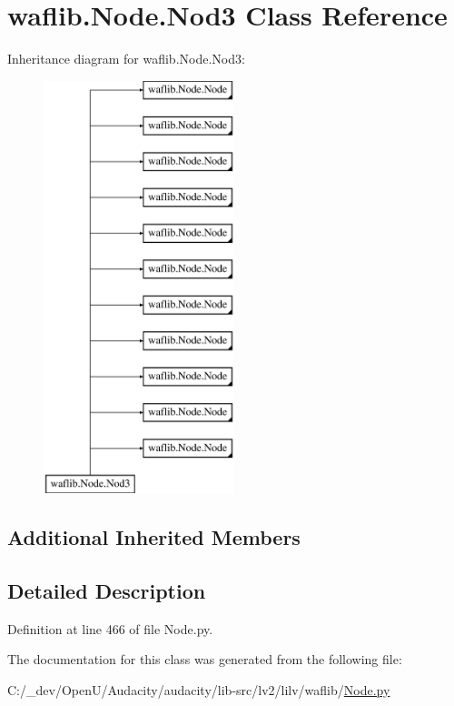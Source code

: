 \hypertarget{classwaflib_1_1_node_1_1_nod3}{}\section{waflib.\+Node.\+Nod3 Class Reference}
\label{classwaflib_1_1_node_1_1_nod3}
Inheritance diagram for waflib.\+Node.\+Nod3\+:\begin{figure}[H]
\begin{center}
\leavevmode
\includegraphics[height=12.000000cm]{classwaflib_1_1_node_1_1_nod3}
\end{center}
\end{figure}
\subsection*{Additional Inherited Members}


\subsection{Detailed Description}


Definition at line 466 of file Node.\+py.



The documentation for this class was generated from the following file\+:\begin{DoxyCompactItemize}
\item 
C\+:/\+\_\+dev/\+Open\+U/\+Audacity/audacity/lib-\/src/lv2/lilv/waflib/\hyperlink{lilv_2waflib_2_node_8py}{Node.\+py}\end{DoxyCompactItemize}
